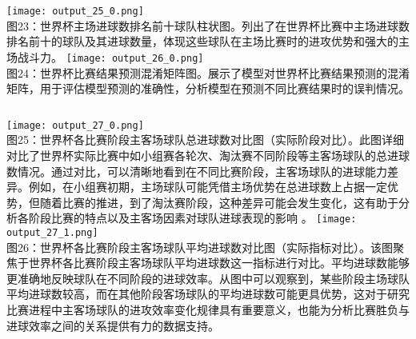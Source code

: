 \documentclass{beamer}
\begin{document}
	\begin{frame}
		\begin{columns}
			\centering
			\texttt{[image: output\_25\_0.png]} \\
			\small 图23：世界杯主场进球数排名前十球队柱状图。列出了在世界杯比赛中主场进球数排名前十的球队及其进球数量，体现这些球队在主场比赛时的进攻优势和强大的主场战斗力。
			\centering
			\texttt{[image: output\_26\_0.png]} \\
			\small 图24：世界杯比赛结果预测混淆矩阵图。展示了模型对世界杯比赛结果预测的混淆矩阵，用于评估模型预测的准确性，分析模型在预测不同比赛结果时的误判情况。
		\end{columns}
	\end{frame}
	
	\begin{frame}
				\begin{columns}
					\column{0.5\textwidth}
					\centering
					\texttt{[image: output\_27\_0.png]} \\
					\small 图25：世界杯各比赛阶段主客场球队总进球数对比图（实际阶段对比）。此图详细对比了世界杯实际比赛中如小组赛各轮次、淘汰赛不同阶段等主客场球队的总进球数情况。通过对比，可以清晰地看到在不同比赛阶段，主客场球队的进球能力差异。例如，在小组赛初期，主场球队可能凭借主场优势在总进球数上占据一定优势，但随着比赛的推进，到了淘汰赛阶段，这种差异可能会发生变化，这有助于分析各阶段比赛的特点以及主客场因素对球队进球表现的影响 。
					\column{0.5\textwidth}
					\centering
					\texttt{[image: output\_27\_1.png]} \\
					\small 图26：世界杯各比赛阶段主客场球队平均进球数对比图（实际指标对比）。该图聚焦于世界杯各比赛阶段主客场球队平均进球数这一指标进行对比。平均进球数能够更准确地反映球队在不同阶段的进球效率。从图中可以观察到，某些阶段主场球队平均进球数较高，而在其他阶段客场球队的平均进球数可能更具优势，这对于研究比赛进程中主客场球队的进攻效率变化规律具有重要意义，也能为分析比赛胜负与进球效率之间的关系提供有力的数据支持。
				\end{columns}
	\end{frame}
			
\end{document}
